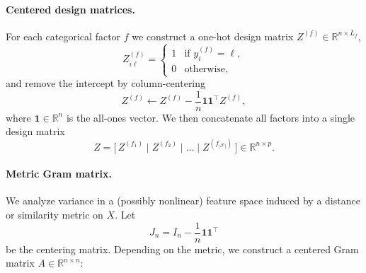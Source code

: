 \documentclass[10pt,twocolumn,letterpaper]{article}
\begin{document}
\paragraph{Centered design matrices.}
For each categorical factor $f$ we construct a one-hot design matrix $Z^{(f)} \in \mathbb{R}^{n \times L_f}$,
\begin{equation}
    Z^{(f)}_{i\ell} = 
    \begin{cases}
        1 & \text{if } y_i^{(f)} = \ell, \\
        0 & \text{otherwise,}
    \end{cases}
\end{equation}
and remove the intercept by column-centering
\begin{equation}
    Z^{(f)} \leftarrow Z^{(f)} - \frac{1}{n}\mathbf{1}\mathbf{1}^\top Z^{(f)},
\end{equation}
where $\mathbf{1} \in \mathbb{R}^n$ is the all-ones vector.  
We then concatenate all factors into a single design matrix
\begin{equation}
    Z = \big[\,Z^{(f_1)} \;\big|\; Z^{(f_2)} \;\big|\; \dots \;\big|\; Z^{(f_{|\mathcal{F}|})}\,\big] \in \mathbb{R}^{n \times p}.
\end{equation}

\paragraph{Metric Gram matrix.}
We analyze variance in a (possibly nonlinear) feature space induced by a distance or similarity metric on $X$. Let
\begin{equation}
    J_n = I_n - \frac{1}{n}\mathbf{1}\mathbf{1}^\top
\end{equation}
be the centering matrix. Depending on the metric, we construct a centered Gram matrix $A \in \mathbb{R}^{n \times n}$:
\end{document}

